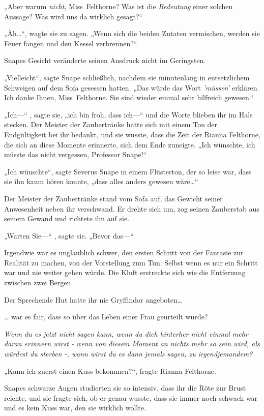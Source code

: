 {„Aber warum \emph{nicht}, Miss~Felthorne? Was ist die \emph{Bedeutung} einer solchen Aussage? Was wird uns da wirklich gesagt?“

„Äh…“, wagte sie zu sagen. „Wenn sich die beiden Zutaten vermischen, werden sie Feuer fangen und den Kessel verbrennen?“

Snapes Gesicht veränderte seinen Ausdruck nicht im Geringsten.

„Vielleicht“, sagte Snape schließlich, nachdem sie minutenlang in entsetzlichem Schweigen auf dem Sofa gesessen hatten. „Das würde das Wort \emph{'müssen'} erklären. Ich danke Ihnen, Miss~Felthorne. Sie sind wieder einmal sehr hilfreich gewesen.“

„Ich—“ , sagte sie, „ich bin froh, dass ich—“ und die Worte blieben ihr im Hals stecken. Der Meister der Zaubertränke hatte sich mit einem Ton der Endgültigkeit bei ihr bedankt, und sie wusste, dass die Zeit der Rianna Felthorne, die sich an diese Momente erinnerte, sich dem Ende zuneigte. „Ich wünschte, ich müsste das nicht vergessen, Professor Snape!“

„Ich wünschte“, sagte Severus Snape in einem Flüsterton, der so leise war, dass sie ihn kaum hören konnte, „dass alles anders gewesen wäre…“

Der Meister der Zaubertränke stand vom Sofa auf, das Gewicht seiner Anwesenheit neben ihr verschwand. Er drehte sich um, zog seinen Zauberstab aus seinem Gewand und richtete ihn auf sie.

„Warten Sie—“ , sagte sie. „Bevor das—“

Irgendwie war es unglaublich schwer, den ersten Schritt von der Fantasie zur Realität zu machen, von der Vorstellung zum Tun. Selbst wenn es nur ein Schritt war und nie weiter gehen würde. Die Kluft erstreckte sich wie die Entfernung zwischen zwei Bergen.

Der Sprechende Hut hatte ihr nie Gryffindor angeboten…

… war es fair, dass so über das Leben einer Frau geurteilt wurde?

\emph{\emph{Wenn} \emph{du} \emph{es jetzt nicht sagen kann, wenn} \emph{du dich hinterher nicht einmal mehr daran erinnern wirst} \emph{- wenn von diesem Moment an nichts mehr so sein wird, als würdest du} \emph{sterben -, wann wirst du} \emph{es dann jemals sagen, zu irgendjemandem?}}

„Kann ich zuerst einen Kuss bekommen?“, fragte Rianna Felthorne.

Snapes schwarze Augen studierten sie so intensiv, dass ihr die Röte zur Brust reichte, und sie fragte sich, ob er genau wusste, dass sie immer noch schwach war und es kein Kuss war, den sie wirklich wollte.

}
